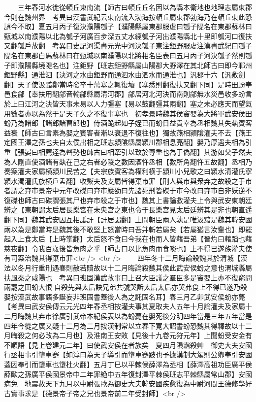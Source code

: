 　　三年春河水徙從頓丘東南流【師古曰頓丘丘名因以為縣本衛地也地理志屬東郡今則在魏州界　考異曰漢書武紀云東南流入渤海按頓丘屬東郡勃海乃在頓丘東此恐誤今不取】夏五月丙子復決濮陽瓠子【濮陽縣屬東郡服䖍曰瓠子隄名在東郡蘇林曰甄城以南濮陽以北為瓠子河廣百步深五丈水經瓠子河出濮陽縣北十里即瓠河口復扶又翻瓠戶故翻　考異曰史記河渠書元光中河決瓠子東注鉅野服䖍注漢書武紀曰瓠子隄名在東郡白馬蘇林曰在甄城以南濮陽以北將相名臣表曰五月丙子河決瓠子然則瓠子即濮陽縣境隄名也】注鉅野【班志鉅野縣屬山陽郡大野澤在其北師古曰即今鄆州鉅野縣】通淮泗【決河之水由鉅野而通泗水由泗水而通淮也】汎郡十六【汎敷劍翻】天子使汲黯鄭當時發卒十萬塞之輒復壞【塞悉則翻復扶又翻下同】是時田蚡奉邑食鄃【奉扶用翻鄃音輸鄃縣屬清河郡】鄃居河北河決而南則鄃無水災邑收多蚡言於上曰江河之決皆天事未易以人力彊塞【易以鼓翻彊其兩翻】塞之未必應天而望氣用數者亦以為然于是天子久之不復事塞也　初孝景時魏其侯竇嬰為大將軍武安侯田蚡乃為諸郎【諸郎諸曹郎也】侍酒跪起如子姪已而蚡日益貴幸為丞相魏其失埶賓客益衰【師古曰言素為嬰之賓客者漸以衰退不復往也】獨故燕相潁隂灌夫不去【燕王定國王澤之孫也夫自太僕出相之班志潁隂縣屬潁川郡相息亮翻】嬰乃厚遇夫相為引重【張晏曰相薦逹為聲勢也師古曰相牽引以致於尊重也為于偽翻】其游如父子然夫為人剛直使酒諸有埶在己之右者必陵之數因酒忤丞相【數所角翻忤五故翻】丞相乃奏案灌夫家屬横潁川民苦之【夫宗族賓客為權利横于潁川小兒歌之曰潁水清灌氏寧潁水濁灌氏族横戶孟翻】收繫夫及支屬皆得棄市罪【刑人與市與衆弃之故殺之于市者謂之弃市景帝中元年改磔曰弃市應劭曰先諸死刑皆磔于市今改曰弃市自非妖逆不復磔也師古曰磔謂張其尸也弃市殺之于市也】魏其上書論救灌夫上令與武安東朝廷辨之【東朝謂太后居長樂宮在未央宫之東也令于長樂宫見太后廷辨其是非也朝直遥翻下同】魏其武安因互相詆訐【訐居謁翻】上問朝臣兩人孰是唯汲黯是魏其韓安國兩以為是鄭當時是魏其後不敢堅上怒當時曰吾并斬若屬矣【若屬猶言汝輩也】即罷起入上食太后【上時掌翻】太后怒不食曰今我在也而人皆藉吾弟【晉灼曰藉蹈也藉慈夜翻】令我百歲後皆魚肉之乎【師古曰以比魚肉而食啖也】上不得已遂族灌夫使有司案治魏其得棄市罪<br />
<br />
　　四年冬十二月晦論殺魏其於渭城【漢法以冬月行重刑遇春則赦若贖故以十二月晦論殺魏其侯此武安侯蚡之意也渭城縣屬扶風秦之咸陽也　考異曰班固漢武故事曰上召大臣議之羣臣多是竇嬰上亦不復窮問兩罷之田蚡大恨自殺先與太后訣兄弟共號哭訴太后太后亦哭弗食上不得已遂乃殺嬰按漢武故事語多誕妄非班固書蓋後人為之託固名耳】春三月乙卯武安侯蚡亦薨　【考異曰武安侯傳云元光四年春丞相按灌夫事其夏取夫人五年十月論灌夫及家屬十二月晦魏其弃市徐廣引武帝本紀侯表以為蚡薨在嬰死後分明四年當是三年五年當是四年今從之廣又疑十二月為二月按漢制常以立春下寛大詔書蚡恐魏其得釋故以十二月晦殺之何必改為二月也】及淮南王安敗【見後十九卷元狩元年】上聞蚡受安金有不順語【見上卷建元二年】曰使武安侯在者族矣　夏四月隕霜殺艸　御史大夫安國行丞相事引墯車蹇【如淳曰為天子導引而墯車蹇跛也予據漢制大駕則公卿奉引安國蓋因奉引而墯車也墯杜火翻】五月丁巳以平棘侯薛澤為丞相【薛澤高祖功臣廣平侯薛歐之孫廣平侯國景帝中二年罪絶中五年復封澤平棘侯班志平棘縣屬常山郡】安國病免　地震赦天下九月以中尉張歐為御史大夫韓安國疾愈復為中尉河間王德修學好古實事求是【德景帝子帝之兄也景帝前二年受封師】<br />
